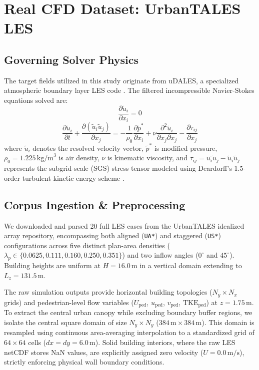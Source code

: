 \documentclass[10pt,twocolumn]{article}
\begin{document}
\section{Real CFD Dataset: UrbanTALES LES}
\subsection{Governing Solver Physics}
The target fields utilized in this study originate from uDALES, a specialized atmospheric boundary layer LES code \cite{heus2010formulation}. The filtered incompressible Navier-Stokes equations solved are:
\begin{equation}
    \frac{\partial \widetilde{u}_i}{\partial x_i} = 0
\end{equation}
\begin{equation}
    \frac{\partial \widetilde{u}_i}{\partial t} + \frac{\partial (\widetilde{u}_i \widetilde{u}_j)}{\partial x_j} = -\frac{1}{\rho_0} \frac{\partial \widetilde{p}^*}{\partial x_i} + \nu \frac{\partial^2 \widetilde{u}_i}{\partial x_j \partial x_j} - \frac{\partial \tau_{ij}}{\partial x_j}
\end{equation}
where $\widetilde{u}_i$ denotes the resolved velocity vector, $\widetilde{p}^*$ is modified pressure, $\rho_0 = 1.225\,\text{kg/m}^3$ is air density, $\nu$ is kinematic viscosity, and $\tau_{ij} = \widetilde{u_i u_j} - \widetilde{u}_i \widetilde{u}_j$ represents the subgrid-scale (SGS) stress tensor modeled using Deardorff's 1.5-order turbulent kinetic energy scheme \cite{deardorff1970numerical}.

\subsection{Corpus Ingestion & Preprocessing}
We downloaded and parsed 20 full LES cases from the UrbanTALES idealized array repository, encompassing both aligned (\texttt{UA*}) and staggered (\texttt{US*}) configurations across five distinct plan-area densities ($\lambda_p \in \{0.0625, 0.111, 0.160, 0.250, 0.351\}$) and two inflow angles ($0^\circ$ and $45^\circ$). Building heights are uniform at $H = 16.0\,\text{m}$ in a vertical domain extending to $L_z = 131.5\,\text{m}$.

The raw simulation outputs provide horizontal building topologies ($N_y \times N_x$ grids) and pedestrian-level flow variables ($U_{\text{ped}}$, $u_{\text{ped}}$, $v_{\text{ped}}$, $\text{TKE}_{\text{ped}}$) at $z = 1.75\,\text{m}$. To extract the central urban canopy while excluding boundary buffer regions, we isolate the central square domain of size $N_y \times N_y$ ($384\,\text{m} \times 384\,\text{m}$). This domain is resampled using continuous area-averaging interpolation to a standardized grid of $64 \times 64$ cells ($dx = dy = 6.0\,\text{m}$). Solid building interiors, where the raw LES netCDF stores NaN values, are explicitly assigned zero velocity ($U = 0.0\,\text{m/s}$), strictly enforcing physical wall boundary conditions.
\end{document}

